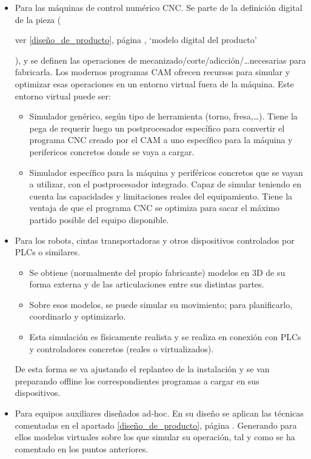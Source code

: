 \documentclass[spanish,12pt,a4paper,final,oneside]{book}
\begin{document}
\begin{itemize}
\item Para las máquinas de control numérico CNC. Se parte de la definición digital de la pieza (\begin{footnotesize}ver \ref{diseño_de_producto}, página \pageref{diseño_de_producto}, `modelo digital del producto'\end{footnotesize}), y se definen las operaciones de mecanizado/corte/adicción/\ldots necesarias para fabricarla. Los modernos programas CAM ofrecen recursos para simular y optimizar esas operaciones en un entorno virtual fuera de la máquina. Este entorno virtual puede ser:
\begin{itemize}
\item Simulador genérico, según tipo de herramienta (torno, fresa,\ldots). Tiene la pega de requerir luego un postprocesador específico para convertir el programa CNC creado por el CAM a uno específico para la máquina y perifericos concretos donde se vaya a cargar.
\item Simulador específico para la máquina y periféricos concretos que se vayan a utilizar, con el postprocesador integrado. Capaz de simular teniendo en cuenta las capacidades y limitaciones reales del equipamiento. Tiene la ventaja de que el programa CNC se optimiza para sacar el máximo partido posible del equipo disponible.
\end{itemize}

\item Para los robots, cintas transportadoras y otros dispositivos controlados por PLCs o similares.
\begin{itemize}
\item Se obtiene (normalmente del propio fabricante) modelos en 3D de su forma externa y de las articulaciones entre sus distintas partes.
\item Sobre esos modelos, se puede simular su movimiento; para planificarlo, coordinarlo y optimizarlo. 
\item Esta simulación es físicamente realista y se realiza en conexión con PLCs y controladores concretos (reales o virtualizados).
\end{itemize}
De esta forma se va ajustando el replanteo de la instalación y se van preparando offline los correspondientes programas a cargar en sus dispositivos. 

\item Para equipos auxiliares diseñados ad-hoc. En su diseño se aplican las técnicas comentadas en el apartado \ref{diseño_de_producto}, página \pageref{diseño_de_producto}. Generando para ellos modelos virtuales sobre los que simular su operación, tal y como se ha comentado en los puntos anteriores.
\end{itemize}
\end{document}
